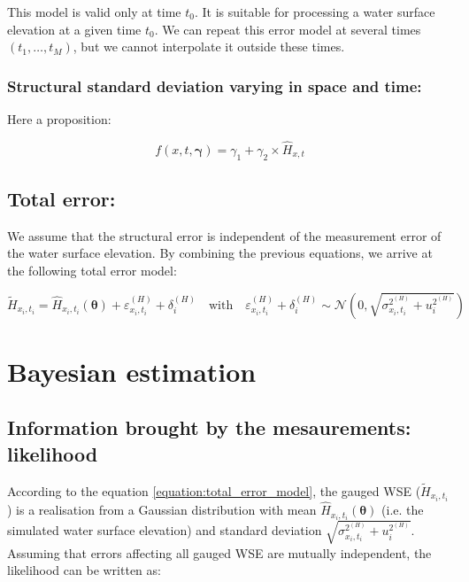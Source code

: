 \documentclass[12pt]{article}
\begin{document}
This model is valid only at time \(t_0\). It is suitable for processing a water surface elevation at a given time \(t_0\). 
We can repeat this error model at several times \((t_1,\ldots,t_M)\), but we cannot interpolate it outside these times.

\subsubsection{\textbf{Structural standard deviation varying in space and time:}}

Here a proposition:

\begin{equation}
    f(x,t,\boldsymbol{\gamma}) = \gamma_1 + \gamma_2 \times \hat{H}_{x,t}
\end{equation}

\subsection{\textbf{Total error:}}

We assume that the structural error is independent of the measurement error of the water surface elevation. By combining the previous equations, we arrive at the following total error model:

\begin{equation}
    \tilde{H}_{x_i,t_i} = \hat{H}_{x_i,t_i}(\boldsymbol{\theta})  + \varepsilon^{(H)}_{x_i,t_i} + \delta_i^{(H)} \quad \text{with} \quad \varepsilon^{(H)}_{x_i,t_i} + \delta_i^{(H)} \sim \mathcal{N}\left(0, \sqrt{\sigma^{2^{(H)}}_{x_i,t_i} + u_i^{2^{(H)}}}\right)
\label{equation:total_error_model}
\end{equation}
 
\section{\textbf{Bayesian estimation}}

\subsection{\textbf{Information brought by the mesaurements: likelihood}}

According to the equation \ref{equation:total_error_model}, the gauged WSE (\(\tilde{H}_{x_i,t_i}\)) is a realisation from a Gaussian distribution with mean \(\hat{H}_{x_i,t_i}(\boldsymbol{\theta})\) (i.e. the simulated water surface elevation) and standard deviation \(\sqrt{\sigma^{2^{(H)}}_{x_i,t_i} + u_i^{2^{(H)}}}\). Assuming that errors affecting all gauged WSE are mutually independent, the likelihood can be written as:
\end{document}
